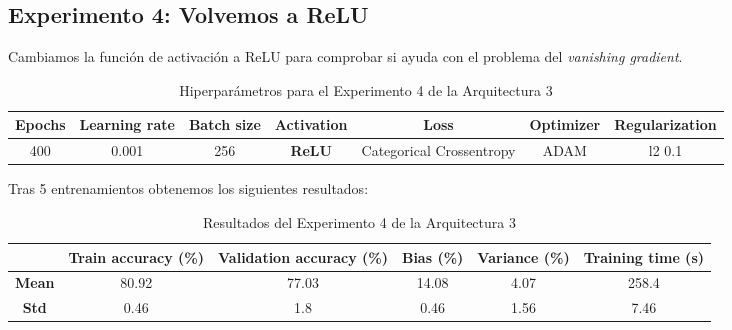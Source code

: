 \documentclass{article}
\begin{document}
		\subsection{Experimento 4: Volvemos a ReLU}
		\label{d-s-a3-e4}
			Cambiamos la funci\'on de activaci\'on a ReLU para comprobar si ayuda con el problema del \textit{vanishing gradient}.
			\begin{table}[!h]
				\begin{tabular}{| c | c | c | c | c | c | c |}
					\textbf{Epochs} & \textbf{Learning rate} & \textbf{Batch size} & \textbf{Activation} & \textbf{Loss} & \textbf{Optimizer} & \textbf{Regularization} \\ \hline
					400 & 0.001 & 256 & \textbf{ReLU} & Categorical Crossentropy & ADAM & l2 0.1
				\end{tabular}
				\caption{Hiperpar\'ametros para el Experimento 4 de la Arquitectura 3}
				\label{tab:hip-d-a3-e4}
			\end{table}
			\newpage			
			Tras 5 entrenamientos obtenemos los siguientes resultados:
			\begin{table}[!h]
				\begin{center}
					\begin{tabular}{ c | c | c | c | c | c |}
						\ & \textbf{Train accuracy (\%)} & \textbf{Validation accuracy (\%)} & \textbf{Bias (\%)} & \textbf{Variance (\%)} & \textbf{Training time (s)} \\ \hline
						\textbf{Mean} & 80.92 & 77.03 & 14.08 & 4.07 & 258.4 \\ \hline
						\textbf{Std} & 0.46 & 1.8 & 0.46 & 1.56 & 7.46 \\ \hline
					\end{tabular}
					\caption{Resultados del Experimento 4 de la Arquitectura 3}
					\label{tab:res-d-a3-e4}
				\end{center}
			\end{table}
			
\end{document}

